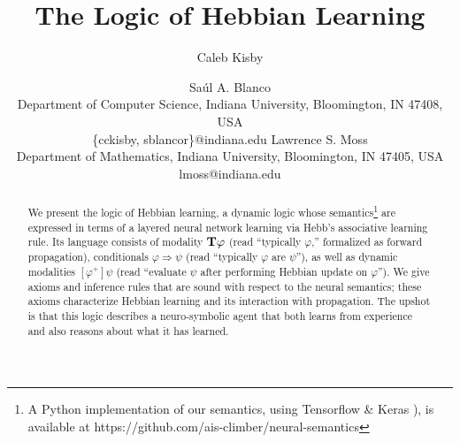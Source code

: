 \documentclass[letterpaper]{article}
\theoremstyle{definition}
\newcommand{\Typ}{\textrm{\textup{\textbf{T}}}}
\begin{document}
%
\title{The Logic of Hebbian Learning}


\author{Caleb Kisby \and Sa\'{u}l A. Blanco\\
Department of Computer Science, Indiana University, Bloomington, IN 47408, USA\\
\{cckisby, sblancor\}@indiana.edu
\AND Lawrence S. Moss \\
Department of Mathematics, Indiana University, Bloomington, IN 47405, USA\\
lmoss@indiana.edu}

\maketitle
\begin{abstract}
We present the logic of Hebbian learning, a dynamic logic whose semantics\footnote{A Python implementation of our semantics, using Tensorflow \& Keras \cite{tensorflow2015-whitepaper}), is available at
\textrm{https://github.com/ais-climber/neural-semantics}
}
are expressed in terms of a layered neural network learning via Hebb's associative learning rule.  Its language consists of modality $\Typ \varphi$ (read ``typically $\varphi$,'' formalized as forward propagation), conditionals $\varphi \Rightarrow \psi$ (read ``typically $\varphi$ are $\psi$''), as well as dynamic modalities $[\varphi^+] \psi$ (read ``evaluate $\psi$ after performing Hebbian update on $\varphi$'').  We give axioms and inference rules that are sound with respect to the neural semantics; these axioms characterize Hebbian learning and its interaction with propagation.  The upshot is that this logic describes a neuro-symbolic agent that both learns from experience and also reasons about what it has learned.
\end{abstract}
\end{document}

